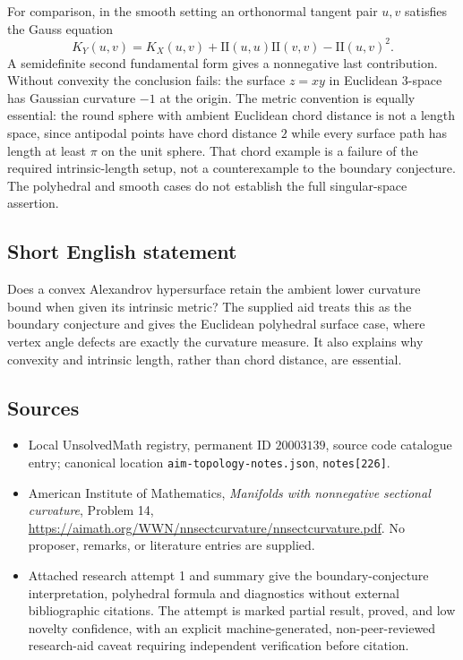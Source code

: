 \documentclass[11pt]{article}
\begin{document}
For comparison, in the smooth setting an orthonormal tangent pair $u,v$ satisfies the Gauss equation
\[
 K_Y(u,v)=K_X(u,v)+
       \mathrm{II}(u,u)\mathrm{II}(v,v)-\mathrm{II}(u,v)^2.
\]
A semidefinite second fundamental form gives a nonnegative last contribution. Without convexity the conclusion fails: the surface $z=xy$ in Euclidean $3$-space has Gaussian curvature $-1$ at the origin. The metric convention is equally essential: the round sphere with ambient Euclidean chord distance is not a length space, since antipodal points have chord distance $2$ while every surface path has length at least $\pi$ on the unit sphere. That chord example is a failure of the required intrinsic-length setup, not a counterexample to the boundary conjecture. The polyhedral and smooth cases do not establish the full singular-space assertion.
\subsection{Short English statement}
Does a convex Alexandrov hypersurface retain the ambient lower curvature bound when given its intrinsic metric? The supplied aid treats this as the boundary conjecture and gives the Euclidean polyhedral surface case, where vertex angle defects are exactly the curvature measure. It also explains why convexity and intrinsic length, rather than chord distance, are essential.
\subsection{Sources}
\begin{itemize}
\item Local UnsolvedMath registry, permanent ID $20003139$, source code catalogue entry; canonical location \texttt{aim-topology-notes.json}, \texttt{notes[226]}.
\item American Institute of Mathematics, \emph{Manifolds with nonnegative sectional curvature}, Problem 14, \url{https://aimath.org/WWN/nnsectcurvature/nnsectcurvature.pdf}. No proposer, remarks, or literature entries are supplied.
\item Attached research attempt 1 and summary give the boundary-conjecture interpretation, polyhedral formula and diagnostics without external bibliographic citations. The attempt is marked partial result, proved, and low novelty confidence, with an explicit machine-generated, non-peer-reviewed research-aid caveat requiring independent verification before citation.
\end{itemize}
\end{document}
